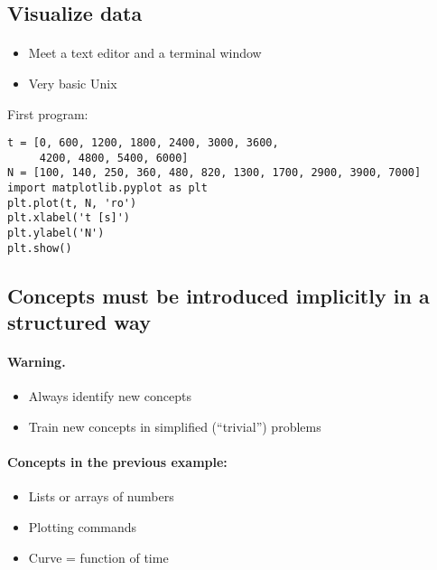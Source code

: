 \documentclass[%
twoside,                 %
final,                   %
10pt]{article}
\begin{document}
\subsection*{Visualize data}


\paragraph{}
\begin{itemize}
 \item Meet a text editor and a terminal window

 \item Very basic Unix
\end{itemize}

\noindent
First program:

\begin{verbatim}
t = [0, 600, 1200, 1800, 2400, 3000, 3600,
     4200, 4800, 5400, 6000]
N = [100, 140, 250, 360, 480, 820, 1300, 1700, 2900, 3900, 7000]
import matplotlib.pyplot as plt
plt.plot(t, N, 'ro')
plt.xlabel('t [s]')
plt.ylabel('N')
plt.show()
\end{verbatim}




\subsection*{Concepts must be introduced implicitly in a structured way}


\paragraph{Warning.}
\begin{itemize}
 \item Always identify new concepts

 \item Train new concepts in simplified (``trivial'') problems
\end{itemize}

\noindent




\paragraph{Concepts in the previous example:}
\begin{itemize}
 \item Lists or arrays of numbers

 \item Plotting commands

 \item Curve = function of time
\end{itemize}
\end{document}
